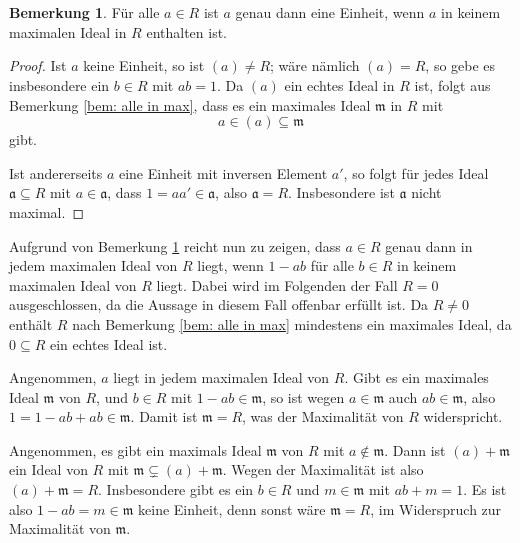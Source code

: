 \documentclass[a4paper,10pt]{article}
\newcounter{satze}
\theoremstyle{definition}
\newtheorem{bem}[satze]{Bemerkung}
\newcommand{\mf}[1]{\mathfrak{#1}}
\begin{document}
\section{}

\begin{bem}\label{bem: einheiten und maximale ideale}
 Für alle $a \in R$ ist $a$ genau dann eine Einheit, wenn $a$ in keinem maximalen Ideal in $R$ enthalten ist.
\end{bem}
\begin{proof}
 Ist $a$ keine Einheit, so ist $(a) \neq R$; wäre nämlich $(a) = R$, so gebe es insbesondere ein $b \in R$ mit $ab=1$. Da $(a)$ ein echtes Ideal in $R$ ist, folgt aus Bemerkung \ref{bem: alle in max}, dass es ein maximales Ideal $\mf{m}$ in $R$ mit
 \[
  a \in (a) \subseteq \mf{m}
 \]
 gibt.

 Ist andererseits $a$ eine Einheit mit inversen Element $a'$, so folgt für jedes Ideal $\mf{a} \subseteq R$ mit $a \in \mf{a}$, dass $1 = aa' \in \mf{a}$, also $\mf{a} = R$. Insbesondere ist $\mf{a}$ nicht maximal.
\end{proof}

Aufgrund von Bemerkung \ref{bem: einheiten und maximale ideale} reicht nun zu zeigen, dass $a \in R$ genau dann in jedem maximalen Ideal von $R$ liegt, wenn $1-ab$ für alle $b \in R$ in keinem maximalen Ideal von $R$ liegt. Dabei wird im Folgenden der Fall $R=0$ ausgeschlossen, da die Aussage in diesem Fall offenbar erfüllt ist. Da $R \neq 0$ enthält $R$ nach Bemerkung \ref{bem: alle in max} mindestens ein maximales Ideal, da $0 \subseteq R$ ein echtes Ideal ist.

Angenommen, $a$ liegt in jedem maximalen Ideal von $R$. Gibt es ein maximales Ideal $\mf{m}$ von $R$, und $b \in R$ mit $1-ab \in \mf{m}$, so ist wegen $a \in \mf{m}$ auch $ab \in \mf{m}$, also $1 = 1-ab + ab \in \mf{m}$. Damit ist $\mf{m} = R$, was der Maximalität von $R$ widerspricht.

Angenommen, es gibt ein maximals Ideal $\mf{m}$ von $R$ mit $a \not\in \mf{m}$. Dann ist $(a) + \mf{m}$ ein Ideal von $R$ mit $\mf{m} \subsetneq (a) + \mf{m}$. Wegen der Maximalität ist also $(a) + \mf{m} = R$. Insbesondere gibt es ein $b \in R$ und $m \in \mf{m}$ mit $ab+m = 1$. Es ist also $1-ab = m \in \mf{m}$ keine Einheit, denn sonst wäre $\mf{m} = R$, im Widerspruch zur Maximalität von $\mf{m}$.
\end{document}
